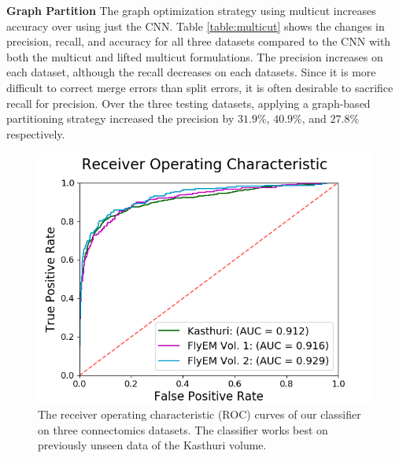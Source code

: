 \noindent\textbf{Graph Partition}
The graph optimization strategy using multicut increases accuracy over using just the CNN.
Table \ref{table:multicut} shows the changes in precision, recall, and accuracy for all three datasets compared to the CNN with both the multicut and lifted multicut formulations.
The precision increases on each dataset, although the recall decreases on each datasets.
Since it is more difficult to correct merge errors than split errors, it is often desirable to sacrifice recall for precision.
Over the three testing datasets, applying a graph-based partitioning strategy increased the precision by $31.9\%$, $40.9\%$, and $27.8\%$ respectively. 

\begin{figure}
	\centering
	\includegraphics[width=0.9\linewidth]{./figures/receiver-operating-characteristic.png}
	\caption{The receiver operating characteristic (ROC) curves of our classifier on three connectomics datasets. The classifier works best on previously unseen data of the Kasthuri volume.}
	\label{fig:receiver-operating-characteristic}
\end{figure}


